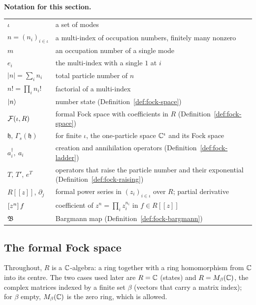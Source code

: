 \medskip
\noindent\textbf{Notation for this section.}
\begin{center}
\begin{tabular}{ll}
$\iota$ & a set of modes\\
$n=(n_i)_{i\in\iota}$ & a multi-index of occupation numbers, finitely many nonzero\\
$m$ & an occupation number of a single mode\\
$e_i$ & the multi-index with a single $1$ at $i$\\
$\lvert n\rvert=\sum_i n_i$ & total particle number of $n$\\
$n!=\prod_i n_i!$ & factorial of a multi-index\\
$\lvert n\rangle$ & number state (Definition~\ref{def:fock-space})\\
$\mathcal F(\iota,R)$ & formal Fock space with coefficients in $R$ (Definition~\ref{def:fock-space})\\
$\mathfrak h$, $\Gamma_s(\mathfrak h)$ & for finite $\iota$, the one-particle space $\mathbb C^\iota$ and its Fock space\\
$a_i^\dagger,\ a_i$ & creation and annihilation operators (Definition~\ref{def:fock-ladder})\\
$T$, $T'$, $e^T$ & operators that raise the particle number and their exponential (Definition~\ref{def:fock-raising})\\
$R[[z]]$, $\partial_j$ & formal power series in $(z_i)_{i\in\iota}$ over $R$; partial derivative\\
$[z^{n}]\,f$ & coefficient of $z^n=\prod_iz_i^{n_i}$ in $f\in R[[z]]$\\
$\mathfrak B$ & Bargmann map (Definition~\ref{def:fock-bargmann})\\
\end{tabular}
\end{center}

\subsection{The formal Fock space}

Throughout, $R$ is a $\mathbb C$-algebra: a ring together with a ring homomorphism from $\mathbb C$ into
its centre. The two cases used later are $R=\mathbb C$ (states) and $R=M_\beta(\mathbb C)$, the complex
matrices indexed by a finite set $\beta$ (vectors that carry a matrix index); for $\beta$
empty, $M_\beta(\mathbb C)$ is the zero ring, which is allowed.


